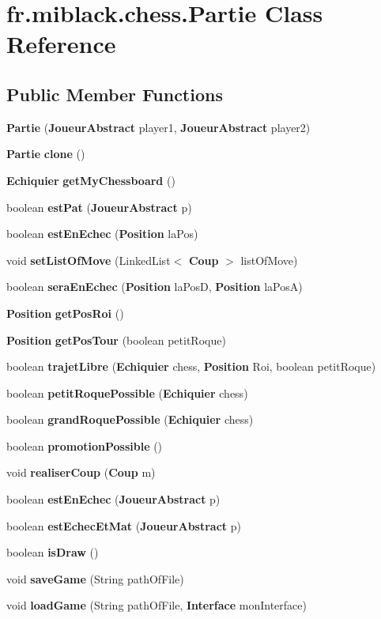 \section{fr.\-miblack.\-chess.\-Partie Class Reference}
\label{classfr_1_1miblack_1_1chess_1_1Partie}
\subsection*{Public Member Functions}
\begin{DoxyCompactItemize}
\item 
{\bf Partie} ({\bf Joueur\-Abstract} player1, {\bf Joueur\-Abstract} player2)
\item 
{\bf Partie} {\bf clone} ()
\item 
{\bf Echiquier} {\bf get\-My\-Chessboard} ()
\item 
boolean {\bf est\-Pat} ({\bf Joueur\-Abstract} p)
\item 
boolean {\bf est\-En\-Echec} ({\bf Position} la\-Pos)
\item 
void {\bf set\-List\-Of\-Move} (Linked\-List$<$ {\bf Coup} $>$ list\-Of\-Move)
\item 
boolean {\bf sera\-En\-Echec} ({\bf Position} la\-Pos\-D, {\bf Position} la\-Pos\-A)
\item 
{\bf Position} {\bf get\-Pos\-Roi} ()
\item 
{\bf Position} {\bf get\-Pos\-Tour} (boolean petit\-Roque)
\item 
boolean {\bf trajet\-Libre} ({\bf Echiquier} chess, {\bf Position} Roi, boolean petit\-Roque)
\item 
boolean {\bf petit\-Roque\-Possible} ({\bf Echiquier} chess)
\item 
boolean {\bf grand\-Roque\-Possible} ({\bf Echiquier} chess)
\item 
boolean {\bf promotion\-Possible} ()
\item 
void {\bf realiser\-Coup} ({\bf Coup} m)
\item 
boolean {\bf est\-En\-Echec} ({\bf Joueur\-Abstract} p)
\item 
boolean {\bf est\-Echec\-Et\-Mat} ({\bf Joueur\-Abstract} p)
\item 
boolean {\bf is\-Draw} ()
\item 
void {\bf save\-Game} (String path\-Of\-File)
\item 
void {\bf load\-Game} (String path\-Of\-File, {\bf Interface} mon\-Interface)
\item 

\end{DoxyCompactItemize}
